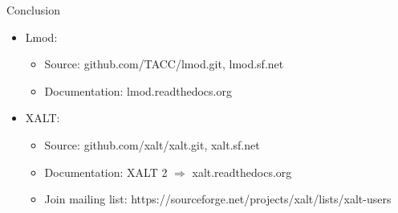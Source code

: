 \documentclass{beamer}
\begin{document}
\begin{frame}{Conclusion}
  \begin{itemize}
    \item Lmod:
      \begin{itemize}
        \item Source: github.com/TACC/lmod.git, lmod.sf.net
        \item Documentation: lmod.readthedocs.org
      \end{itemize}
    \item XALT:
      \begin{itemize}
        \item Source: github.com/xalt/xalt.git, xalt.sf.net
        \item Documentation: XALT 2 $\Rightarrow$ xalt.readthedocs.org
        \item Join mailing list: https://sourceforge.net/projects/xalt/lists/xalt-users
      \end{itemize}
  \end{itemize}
\end{frame}

%
\end{document}
